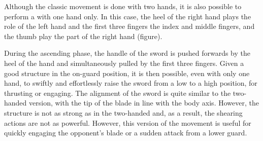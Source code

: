 Although the classic movement is done with two hands, it is also possible to perform a \Duo{} with one hand only. In this case, the heel of the right hand plays the role of the left hand and the first three fingers \textemdash{} the index and middle fingers, and the thumb \textemdash{} play the part of the right hand (figure). 

During the ascending phase, the handle of the sword is pushed forwards by the heel of the hand and simultaneously pulled by the first three fingers. Given a good structure in the on-guard position, it is then possible, even with only one hand, to swiftly and effortlessly raise the sword from a low to a high position, for thrusting or engaging.  
The alignment of the sword is quite similar to the two-handed version, with the tip of the blade in line with the body axis. However, the structure is not as strong as in the two-handed \Duo{} and, as a result, the shearing actions are not as powerful. However, this version of the movement is useful for quickly engaging the opponent's blade or a sudden attack from a lower guard. 